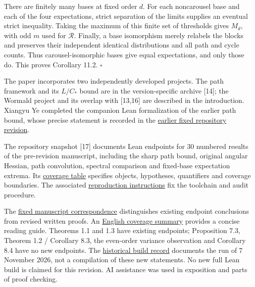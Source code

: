 \documentclass[11pt,a4paper]{article}
\makeatletter
\renewcommand\section{\@startsection{section}{1}{\z@}{-2.8ex plus -1ex minus -.2ex}{1.1ex plus .2ex}{\normalfont\large\bfseries}}
\makeatother
\begin{document}
There are finitely many bases at fixed order \(d\). For each noncarousel base and each of the four expectations, strict separation of the limits supplies an eventual strict inequality. Taking the maximum of this finite set of thresholds gives \(M_d\), with odd \(m\) used for \(\mathcal R\). Finally, a base isomorphism merely relabels the blocks and preserves their independent identical distributions and all path and cycle counts. Thus carousel-isomorphic bases give equal expectations, and only those do. This proves Corollary 11.2. \(\square\)

\section{Author statement}\label{author-statement}

The paper incorporates two independently developed projects. The path framework and its \(L/C_*\) bound are in the version-specific archive {[}14{]}; the Wormald project and its overlap with {[}13,16{]} are described in the introduction. Xiangyu Ye completed the companion Lean formalization of the earlier path bound, whose precise statement is recorded in the \href{https://github.com/LStar404/tournament-hamiltonian-paths/blob/a01680d39647bc4fa2f88d56b4e01a4b8dc98d48/formalization/VERIFICATION.md}{earlier fixed repository revision}.

The repository snapshot {[}17{]} documents Lean endpoints for 30 numbered results of the pre-revision manuscript, including the sharp path bound, original angular Hessian, path convolution, spectral comparison and fixed-base expectation extrema. Its \href{https://github.com/LStar404/tournament-hamiltonian-counts-20261028/blob/c678e9ee24fb304cad755a27c99f511c8640f75e/formal/COVERAGE.zh.md}{coverage table} specifies objects, hypotheses, quantifiers and coverage boundaries. The associated \href{https://github.com/LStar404/tournament-hamiltonian-counts-20261028/blob/c678e9ee24fb304cad755a27c99f511c8640f75e/formal/README.zh.md}{reproduction instructions} fix the toolchain and audit procedure.

The \href{https://github.com/LStar404/tournament-hamiltonian-counts-20261028/blob/1b66d66cd287310c3a85dc3c64816fa319d55af2/review/revision-20261111/lean_correspondence.md}{fixed manuscript correspondence} distinguishes existing endpoint conclusions from revised written proofs. An \href{https://github.com/LStar404/tournament-hamiltonian-counts-20261028/blob/fbe1b67e72c6119d865c801455e829329dea0c2a/review/revision-20261111-round2/lean_coverage.en.md}{English coverage summary} provides a concise reading guide. Theorems 1.1 and 1.3 have existing endpoints; Proposition 7.3, Theorem 1.2 / Corollary 8.3, the even-order variance observation and Corollary 8.4 have no new endpoints. The \href{https://github.com/LStar404/tournament-hamiltonian-counts-20261028/blob/1b66d66cd287310c3a85dc3c64816fa319d55af2/review/lean-rerun-20261107/summary.json}{historical build record} documents the run of 7 November 2026, not a compilation of these new statements. No new full Lean build is claimed for this revision. AI assistance was used in exposition and parts of proof checking.
\end{document}
